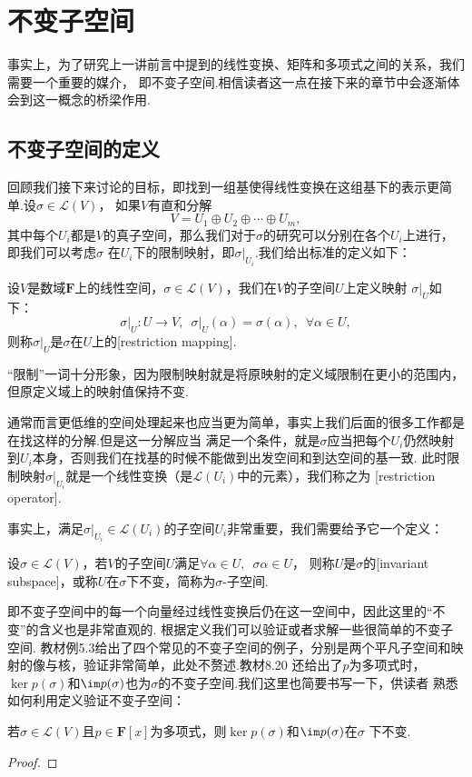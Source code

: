 \chapter{不变子空间}

事实上，为了研究上一讲前言中提到的线性变换、矩阵和多项式之间的关系，我们需要一个重要的媒介，
即不变子空间.相信读者这一点在接下来的章节中会逐渐体会到这一概念的桥梁作用.

\section{不变子空间的定义}
回顾我们接下来讨论的目标，即找到一组基使得线性变换在这组基下的表示更简单.设$\sigma\in\mathcal{L}(V)$，
如果$V$有直和分解
\[V=U_1\oplus U_2\oplus\cdots\oplus U_m,\]
其中每个$U_i$都是$V$的真子空间，那么我们对于$\sigma$的研究可以分别在各个$U_i$上进行，即我们可以考虑$\sigma$
在$U_i$下的限制映射，即$\sigma\vert_{U_i}$.我们给出标准的定义如下：
\begin{definition}
    设$V$是数域$\mathbf{F}$上的线性空间，$\sigma\in\mathcal{L}(V)$，我们在$V$的子空间$U$上定义映射
    $\sigma\vert_U$如下：
    \[\sigma\vert_U:U\to V,\enspace\sigma\vert_U(\alpha)=\sigma(\alpha),\enspace\forall \alpha\in U,\]
    则称$\sigma\vert_U$是$\sigma$在$U$上的[restriction mapping].
\end{definition}

``限制''一词十分形象，因为限制映射就是将原映射的定义域限制在更小的范围内，但原定义域上的映射值保持不变.

通常而言更低维的空间处理起来也应当更为简单，事实上我们后面的很多工作都是在找这样的分解.但是这一分解应当
满足一个条件，就是$\sigma$应当把每个$U_i$仍然映射到$U_i$本身，否则我们在找基的时候不能做到出发空间和到达空间的基一致.
此时限制映射$\sigma\vert_{U_i}$就是一个线性变换（是$\mathcal{L}(U_i)$中的元素），我们称之为
[restriction operator].

事实上，满足$\sigma\vert_{U_i}\in\mathcal{L}(U_i)$的子空间$U_i$非常重要，我们需要给予它一个定义：
\begin{definition}
    设$\sigma\in \mathcal{L}(V)$，若$V$的子空间$U$满足$\forall \alpha\in U,\enspace \sigma\alpha\in U$，
    则称$U$是$\sigma$的[invariant subspace]，或称$U$在$\sigma$下不变，简称为$\sigma$-子空间.
\end{definition}
即不变子空间中的每一个向量经过线性变换后仍在这一空间中，因此这里的``不变''的含义也是非常直观的.
根据定义我们可以验证或者求解一些很简单的不变子空间.
教材例5.3给出了四个常见的不变子空间的例子，分别是两个平凡子空间和映射的像与核，验证非常简单，此处不赘述.教材8.20
还给出了$p$为多项式时，$\ker p(\sigma)$和$\im p(\sigma)$也为$\sigma$的不变子空间.我们这里也简要书写一下，供读者
熟悉如何利用定义验证不变子空间：
\begin{example}
    若$\sigma\in\mathcal{L}(V)$且$p\in\mathbf{F}[x]$为多项式，则$\ker p(\sigma)$和$\im p(\sigma)$在$\sigma$
    下不变.
\end{example}
\begin{proof}
    
\end{proof}

